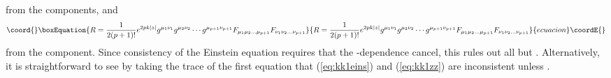 \documentclass[a4paper,12pt]{article}
\def\fft#1#2{{#1\over#2}}
\begin{document}
%
from the \myHighlight{$\mu\nu$}\coordHE{} components, and
%
\begin{equation}\coord{}\boxEquation{
\label{eq:kk1zz}
R=\fft1{2(p+1)!}e^{2pk|z|}
g^{\mu_{1}\nu_{1}}g^{\mu_{2}\nu_{2}}\cdots g^{\mu_{p+1}\nu_{p+1}}
{F}_{\mu_{1}\mu_{2}\ldots \mu_{p+1}}
{F}_{\nu_{1}\nu_{2}\ldots \nu_{p+1}}
}{
R=\fft1{2(p+1)!}e^{2pk|z|}
g^{\mu_{1}\nu_{1}}g^{\mu_{2}\nu_{2}}\cdots g^{\mu_{p+1}\nu_{p+1}}
{F}_{\mu_{1}\mu_{2}\ldots \mu_{p+1}}
{F}_{\nu_{1}\nu_{2}\ldots \nu_{p+1}}
}{ecuacion}\coordE{}\end{equation}
%
from the \coordHE{} component.
Since consistency of the Einstein equation requires that the
\coordHE{}-dependence cancel, this rules out all but \coordHE{}.  Alternatively, it is
straightforward to see by taking the trace of the first equation that
(\ref{eq:kk1eins}) and (\ref{eq:kk1zz}) are inconsistent unless \coordHE{}.
\end{document}
